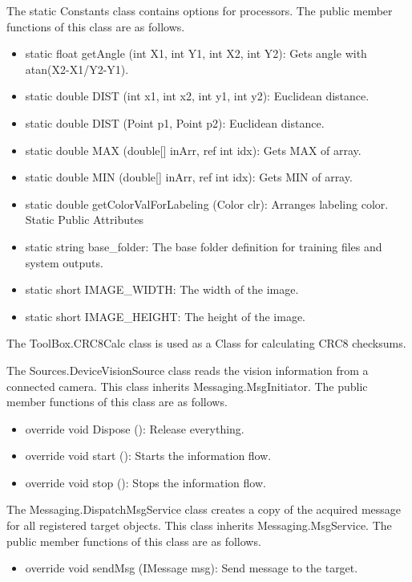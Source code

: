 \documentclass[a4paper,oneside,12pt]{report}
\begin{document}
The static Constants class contains options for processors.  
The public member functions of this class are as follows.
\begin{itemize}
\item static float getAngle (int X1, int Y1, int X2, int Y2): Gets angle with atan(X2-X1/Y2-Y1). 
\item static double DIST (int x1, int x2, int y1, int y2): Euclidean distance.
\item static double DIST (Point p1, Point p2): Euclidean distance. 
\item static double MAX (double[] inArr, ref int idx): Gets MAX of array. 
\item static double MIN (double[] inArr, ref int idx): Gets MIN of array. 
\item static double getColorValForLabeling (Color clr): Arranges labeling color. Static Public Attributes
\item static string base\_folder: The base folder definition for training files and system outputs. 
\item static short IMAGE\_WIDTH: The width of the image. 
\item static short IMAGE\_HEIGHT: The height of the image.
\end{itemize}

The ToolBox.CRC8Calc class is used as a Class for calculating CRC8 checksums.

The Sources.DeviceVisionSource class reads the vision information from a connected camera.
This class inherits Messaging.MsgInitiator. The public member functions of this class are as follows.
\begin{itemize}
\item override void Dispose (): Release everything. 
\item override void start (): Starts the information flow. 
\item override void stop (): Stops the information flow. 
\end{itemize}

The Messaging.DispatchMsgService class creates a copy of the acquired message for all registered target objects.
This class inherits Messaging.MsgService. The public member functions of this class are as follows.
\begin{itemize}
\item override void sendMsg (IMessage msg): Send message to the target. 
\end{itemize}
\end{document}
